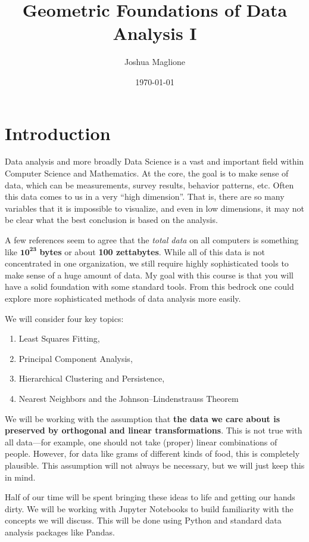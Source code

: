 \documentclass[a4paper, 12pt]{article}
\title{Geometric Foundations of Data Analysis I}
\author{Joshua Maglione}
\date{\today}
\numberwithin{equation}{section}
\numberwithin{figure}{section}
\theoremstyle{definition}
\begin{document}
\maketitle
\tableofcontents

\section{Introduction}

Data analysis and more broadly Data Science is a vast and important field within
Computer Science and Mathematics. At the core, the goal is to make sense of
data, which can be measurements, survey results, behavior patterns, etc. Often
this data comes to us in a very ``high dimension''. That is, there are so many
variables that it is impossible to visualize, and even in low
dimensions, it may not be clear what the best conclusion is based on the
analysis. 

A few references seem to agree that the \textit{total data} on all computers is
something like $\mathbf{10^{23}}$ \textbf{bytes} or about \textbf{100
zettabytes}. While all of this data is not concentrated in one organization, we
still require highly sophisticated tools to make sense of a huge amount of data.
My goal with this course is that you will have a solid foundation with some
standard tools. From this bedrock one could explore more sophisticated methods
of data analysis more easily. 

\bigskip

We will consider four key topics:
\begin{enumerate} 
	\item Least Squares Fitting,
	\item Principal Component Analysis,
	\item Hierarchical Clustering and Persistence,
	\item Nearest Neighbors and the Johnson--Lindenstrauss Theorem
\end{enumerate}

We will be working with the assumption that \textbf{the data we care about is
preserved by orthogonal and linear transformations}. This is not true with all
data---for example, one should not take (proper) linear combinations of people.
However, for data like grams of different kinds of food, this is completely
plausible. This assumption will not always be necessary, but we will just keep
this in mind. 

Half of our time will be spent bringing these ideas to life and getting our
hands dirty. We will be working with Jupyter Notebooks to build familiarity with
the concepts we will discuss. This will be done using Python and standard data
analysis packages like Pandas. 
\end{document}
